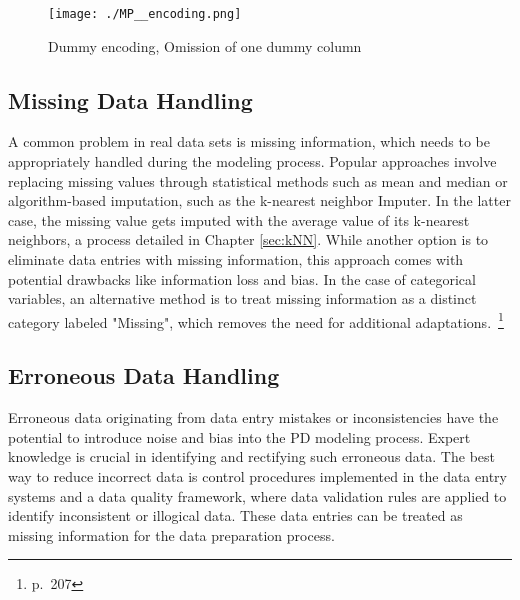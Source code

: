 \begin{figure}[H]
	\centering
	\texttt{[image: ./MP\_\_encoding.png]}
    \caption{Dummy encoding, Omission of one dummy column}
    \label{fig:dp_dumenc}
\end{figure}

\subsection{Missing Data Handling}
A common problem in real data sets is missing information, which needs to be appropriately handled during the modeling process. Popular approaches involve replacing missing values through statistical methods such as mean and median or algorithm-based imputation, such as the k-nearest neighbor Imputer. In the latter case,  the missing value gets imputed with the average value of its k-nearest neighbors, a process detailed in Chapter \ref{sec:kNN}. While another option is to eliminate data entries with missing information, this approach comes with potential drawbacks like information loss and bias. In the case of categorical variables, an alternative method is to treat missing information as a distinct category labeled "Missing", which removes the need for additional adaptations.~\footnote{\cite{Python:2022} p.~207}

\subsection{Erroneous Data Handling}
Erroneous data originating from data entry mistakes or inconsistencies have the potential to introduce noise and bias into the PD modeling process. Expert knowledge is crucial in identifying and rectifying such erroneous data. The best way to reduce incorrect data is control procedures implemented in the data entry systems and a data quality framework, where data validation rules are applied to identify inconsistent or illogical data. These data entries can be treated as missing information for the data preparation process.


